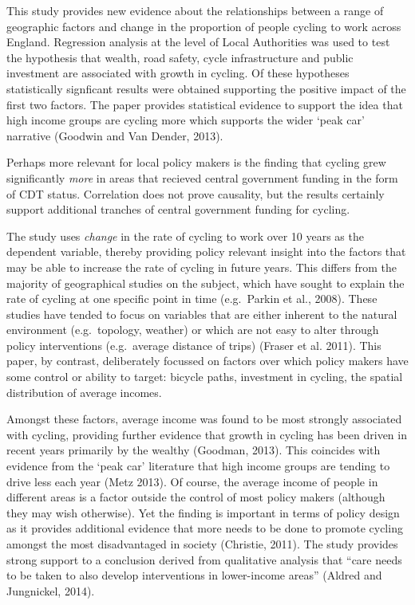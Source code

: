 This study provides new evidence about the relationships between a range
of geographic factors and change in the proportion of people cycling to
work across England. Regression analysis at the level of Local
Authorities was used to test the hypothesis that wealth, road safety,
cycle infrastructure and public investment are associated with growth in
cycling. Of these hypotheses statistically signficant results were
obtained supporting the positive impact of the first two factors. The
paper provides statistical evidence to support the idea that high income
groups are cycling more which supports the wider `peak car' narrative
(Goodwin and Van Dender, 2013).

Perhaps more relevant for local policy makers is the finding that
cycling grew significantly \emph{more} in areas that recieved central
government funding in the form of CDT status. Correlation does not prove
causality, but the results certainly support additional tranches of
central government funding for cycling.

The study uses \emph{change} in the rate of cycling to work over 10
years as the dependent variable, thereby providing policy relevant
insight into the factors that may be able to increase the rate of
cycling in future years. This differs from the majority of geographical
studies on the subject, which have sought to explain the rate of cycling
at one specific point in time (e.g.~Parkin et al., 2008). These studies
have tended to focus on variables that are either inherent to the
natural environment (e.g.~topology, weather) or which are not easy to
alter through policy interventions (e.g.~average distance of trips)
(Fraser et al. 2011). This paper, by contrast, deliberately focussed on
factors over which policy makers have some control or ability to target:
bicycle paths, investment in cycling, the spatial distribution of
average incomes.

Amongst these factors, average income was found to be most strongly
associated with cycling, providing further evidence that growth in
cycling has been driven in recent years primarily by the wealthy
(Goodman, 2013). This coincides with evidence from the `peak car'
literature that high income groups are tending to drive less each year
(Metz 2013). Of course, the average income of people in different areas
is a factor outside the control of most policy makers (although they may
wish otherwise). Yet the finding is important in terms of policy design
as it provides additional evidence that more needs to be done to promote
cycling amongst the most disadvantaged in society (Christie, 2011). The
study provides strong support to a conclusion derived from qualitative
analysis that ``care needs to be taken to also develop interventions in
lower-income areas'' (Aldred and Jungnickel, 2014).

